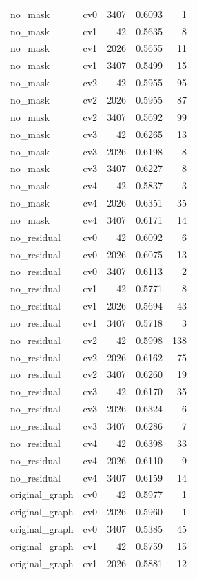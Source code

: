 \documentclass[10pt]{article}
\begin{document}
\begin{longtable}{llrrr}
no\_mask & cv0 & 3407 & 0.6093 & 1\\
no\_mask & cv1 & 42 & 0.5635 & 8\\
no\_mask & cv1 & 2026 & 0.5655 & 11\\
no\_mask & cv1 & 3407 & 0.5499 & 15\\
no\_mask & cv2 & 42 & 0.5955 & 95\\
no\_mask & cv2 & 2026 & 0.5955 & 87\\
no\_mask & cv2 & 3407 & 0.5692 & 99\\
no\_mask & cv3 & 42 & 0.6265 & 13\\
no\_mask & cv3 & 2026 & 0.6198 & 8\\
no\_mask & cv3 & 3407 & 0.6227 & 8\\
no\_mask & cv4 & 42 & 0.5837 & 3\\
no\_mask & cv4 & 2026 & 0.6351 & 35\\
no\_mask & cv4 & 3407 & 0.6171 & 14\\
no\_residual & cv0 & 42 & 0.6092 & 6\\
no\_residual & cv0 & 2026 & 0.6075 & 13\\
no\_residual & cv0 & 3407 & 0.6113 & 2\\
no\_residual & cv1 & 42 & 0.5771 & 8\\
no\_residual & cv1 & 2026 & 0.5694 & 43\\
no\_residual & cv1 & 3407 & 0.5718 & 3\\
no\_residual & cv2 & 42 & 0.5998 & 138\\
no\_residual & cv2 & 2026 & 0.6162 & 75\\
no\_residual & cv2 & 3407 & 0.6260 & 19\\
no\_residual & cv3 & 42 & 0.6170 & 35\\
no\_residual & cv3 & 2026 & 0.6324 & 6\\
no\_residual & cv3 & 3407 & 0.6286 & 7\\
no\_residual & cv4 & 42 & 0.6398 & 33\\
no\_residual & cv4 & 2026 & 0.6110 & 9\\
no\_residual & cv4 & 3407 & 0.6159 & 14\\
original\_graph & cv0 & 42 & 0.5977 & 1\\
original\_graph & cv0 & 2026 & 0.5960 & 1\\
original\_graph & cv0 & 3407 & 0.5385 & 45\\
original\_graph & cv1 & 42 & 0.5759 & 15\\
original\_graph & cv1 & 2026 & 0.5881 & 12\\

\end{longtable}
\end{document}
